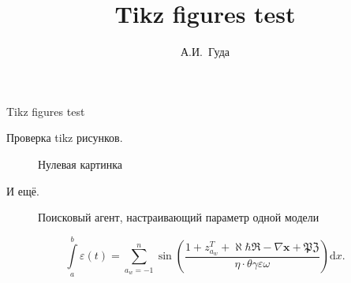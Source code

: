 \documentclass[a4paper,12pt]{article}
\title{Tikz figures test}
\author{А.И.~Гуда}
\begin{document}
\begin{center}
\Large{Tikz figures test}
\end{center}

Проверка tikz рисунков.

\begin{figure}[h!]
\begin{center}

\end{center}
\caption{Нулевая картинка}
\label{atu:f:f0}
\end{figure}

И ещё.

\begin{figure}[htb!]
\begin{center}

\end{center}
\caption{Поисковый агент, настраивающий параметр одной модели}
\label{atu:f:agent1}
\end{figure}


\[
  \int\limits_{a}^{b} \varepsilon(t)
  =
  \sum\limits_{a_w=-1}^{n} \sin\left(
    \frac{ 1 + z_{a_w}^T + \aleph \hbar \Re - \nabla \mathbf{x} + \mathfrak{PZ} }
         {\eta \cdot \theta \gamma \varepsilon \omega}
  \right) \mathrm{d} x.
\]
\end{document}
